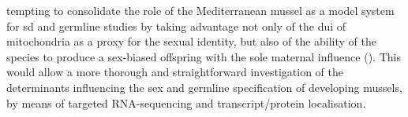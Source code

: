 tempting to consolidate the role of the Mediterranean mussel as a model system for \gls{sd} and germline studies by taking advantage not only of the \gls{dui} of mitochondria as a proxy for the sexual identity, but also of the ability of the species to produce a sex-biased offspring with the sole maternal influence (). This would allow a more thorough and straightforward investigation of the determinants influencing the sex and germline specification of developing mussels, by means of targeted RNA-sequencing and transcript/protein localisation.

% 
